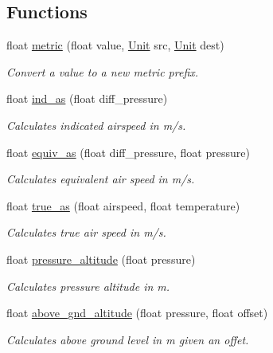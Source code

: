 \subsection*{Functions}
\begin{DoxyCompactItemize}
\item 
float \hyperlink{namespaceaero_1_1convert_ad9f4211beafba2bff6ec617f78d1b52e}{metric} (float value, \hyperlink{namespaceaero_1_1convert_afd79904e6a1f0bd81d9491c37004e10e}{Unit} src, \hyperlink{namespaceaero_1_1convert_afd79904e6a1f0bd81d9491c37004e10e}{Unit} dest)
\begin{DoxyCompactList}\small\item\em Convert a value to a new metric prefix. \end{DoxyCompactList}\item 
float \hyperlink{namespaceaero_1_1convert_ae3cb87c1ce3ff50f8af2180be377562d}{ind\+\_\+as} (float diff\+\_\+pressure)
\begin{DoxyCompactList}\small\item\em Calculates indicated airspeed in m/s. \end{DoxyCompactList}\item 
float \hyperlink{namespaceaero_1_1convert_a0805769f0bdd8dd4513c4825ac89e8fa}{equiv\+\_\+as} (float diff\+\_\+pressure, float pressure)
\begin{DoxyCompactList}\small\item\em Calculates equivalent air speed in m/s. \end{DoxyCompactList}\item 
float \hyperlink{namespaceaero_1_1convert_a76676002927e969f289ea46720db730b}{true\+\_\+as} (float airspeed, float temperature)
\begin{DoxyCompactList}\small\item\em Calculates true air speed in m/s. \end{DoxyCompactList}\item 
float \hyperlink{namespaceaero_1_1convert_ae6db0406b830c72f11fd4de30e9ffc24}{pressure\+\_\+altitude} (float pressure)
\begin{DoxyCompactList}\small\item\em Calculates pressure altitude in m. \end{DoxyCompactList}\item 
float \hyperlink{namespaceaero_1_1convert_a05ebdd5d199459299bdd167c089d7d12}{above\+\_\+gnd\+\_\+altitude} (float pressure, float offset)
\begin{DoxyCompactList}\small\item\em Calculates above ground level in m given an offet. \end{DoxyCompactList}\item 

\end{DoxyCompactItemize}
